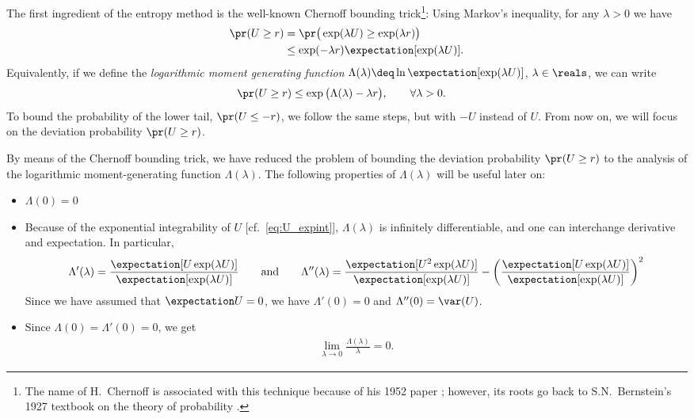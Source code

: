 \documentclass{article}
\theoremstyle{plain}
\begin{document}
The first ingredient of the entropy method is the well-known Chernoff bounding trick\footnote{The name of H.~Chernoff is associated with this technique because of his 1952 paper \cite{Chernoff}; however, its roots go back to S.N.~Bernstein's 1927 textbook on the theory of probability \cite{Bernstein}.}: Using Markov's inequality, for any $\lambda > 0$ we have
\begin{align*}
	\pr (U  \ge r) &= \pr \big(\exp(\lambda U) \ge \exp(\lambda r)\big)\\
	&\le \exp(-\lambda r) \expectation[\exp(\lambda U)].
\end{align*}
Equivalently, if we define the {\em logarithmic moment generating function} $\Lambda(\lambda) \deq \ln \expectation[\exp(\lambda U)]$, $\lambda \in \reals$, we can write
\begin{align}\label{eq:upper_tail}
	\pr (U \ge r) & \le \exp\big(\Lambda(\lambda)-\lambda r\big), \qquad \forall \lambda > 0.
\end{align}
To bound the probability of the lower tail, $\pr (U \le - r)$, we follow the same steps, but with $-U$ instead of $U$. From now on, we will focus on the deviation probability $\pr (U \ge r)$.

By means of the Chernoff bounding trick, we have reduced the problem of bounding the deviation probability $\pr (U \ge r)$ to the analysis of the logarithmic moment-generating function $\Lambda(\lambda)$. The following properties of $\Lambda(\lambda)$ will be useful later on:
\begin{itemize}
	\item $\Lambda(0) = 0$
	\item Because of the exponential integrability of $U$ [cf.~\eqref{eq:U_expint}], $\Lambda(\lambda)$ is infinitely differentiable, and  one can interchange derivative and expectation. In particular,
	\begin{align}\label{eq:LMGF_derivatives}
		\Lambda'(\lambda) = \frac{\expectation[U \exp(\lambda U)]}{\expectation[\exp(\lambda U)]} \qquad \text{and} \qquad
		\Lambda''(\lambda) = \frac{\expectation[U^2 \exp(\lambda U)]}{\expectation[\exp(\lambda U)]} - \left( \frac{\expectation[U \exp(\lambda U)]}{\expectation[\exp(\lambda U)]} \right)^2
	\end{align}
	Since we have assumed that $\expectation U = 0$, we have $\Lambda'(0) = 0$ and $\Lambda''(0) = \var (U)$.
	\item Since $\Lambda(0) = \Lambda'(0) = 0$, we get
	\begin{align}\label{eq:zero_lambda_limit}
		\lim_{\lambda \to 0} \frac{\Lambda(\lambda)}{\lambda} = 0.
	\end{align}
\end{itemize}
\end{document}
